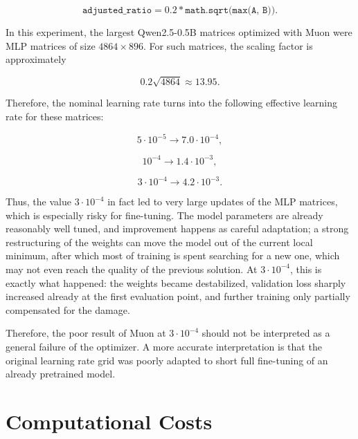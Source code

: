 \documentclass{article}
\begin{document}
$$
\texttt{adjusted\_ratio} = 0.2 * \texttt{math.sqrt(max(A, B))}.
$$

In this experiment, the largest Qwen2.5-0.5B matrices optimized with Muon were MLP matrices of size $4864 \times 896$. For such matrices, the scaling factor is approximately

$$
0.2 \sqrt{4864} \approx 13.95.
$$

Therefore, the nominal learning rate turns into the following effective learning rate for these matrices:

$$
5 \cdot 10^{-5} \rightarrow 7.0 \cdot 10^{-4},
$$

$$
10^{-4} \rightarrow 1.4 \cdot 10^{-3},
$$

$$
3 \cdot 10^{-4} \rightarrow 4.2 \cdot 10^{-3}.
$$

Thus, the value $3 \cdot 10^{-4}$ in fact led to very large updates of the MLP matrices, which is especially risky for fine-tuning. The model parameters are already reasonably well tuned, and improvement happens as careful adaptation; a strong restructuring of the weights can move the model out of the current local minimum, after which most of training is spent searching for a new one, which may not even reach the quality of the previous solution. At $3 \cdot 10^{-4}$, this is exactly what happened: the weights became destabilized, validation loss sharply increased already at the first evaluation point, and further training only partially compensated for the damage.

Therefore, the poor result of Muon at $3 \cdot 10^{-4}$ should not be interpreted as a general failure of the optimizer. A more accurate interpretation is that the original learning rate grid was poorly adapted to short full fine-tuning of an already pretrained model.

\section{Computational Costs}

\begin{table}[ht]
\centering
{}
\caption{Computational costs at the same learning rate.}
\label{tab:same-lr-resource-efficiency}
\end{table}
\end{document}
